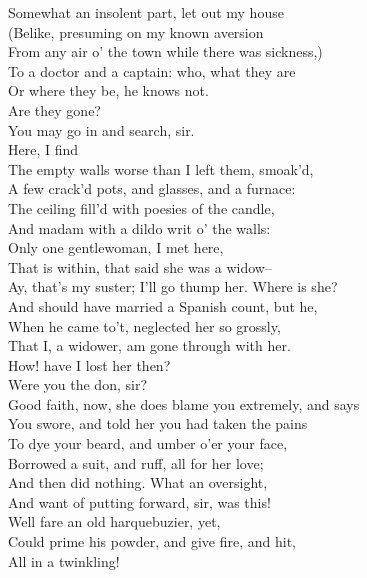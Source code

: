 \documentclass{memoir}
\begin{document}
\begin{drama*}
 Somewhat an insolent part, let out my house\\
 (Belike, presuming on my known aversion\\
 From any air o' the town while there was sickness,)\\
 To a doctor and a captain: who, what they are\\
 Or where they be, he knows not.\\
\mammonspeaks {} Are they gone?\\
\lovewitspeaks  You may go in and search, sir.\\
 Here, I find\\
 The empty walls worse than I left them, smoak'd,\\
 A few crack'd pots, and glasses, and a furnace:\\
 The ceiling fill'd with poesies of the candle,\\
 And madam with a dildo writ o' the walls:\\
 Only one gentlewoman, I met here,\\
 That is within, that said she was a widow--\\
\kastrilspeaks  Ay, that's my suster; I'll go thump her. Where is she?\\
\lovewitspeaks  And should have married a Spanish count, but he,\\
 When he came to't, neglected her so grossly,\\
 That I, a widower, am gone through with her.\\
\surlyspeaks  How! have I lost her then?\\
\lovewitspeaks {} Were you the don, sir?\\
 Good faith, now, she does blame you extremely, and says\\
 You swore, and told her you had taken the pains\\
 To dye your beard, and umber o'er your face,\\
 Borrowed a suit, and ruff, all for her love;\\
 And then did nothing. What an oversight,\\
 And want of putting forward, sir, was this!\\
 Well fare an old harquebuzier, yet,\\
 Could prime his powder, and give fire, and hit,\\
 All in a twinkling!\\

\end{drama*}
\end{document}
